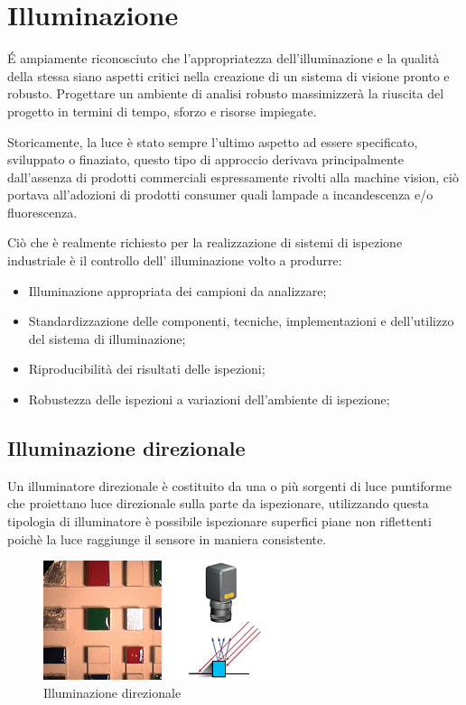 \section{Illuminazione}

 \'{E} ampiamente riconosciuto che l'appropriatezza
dell'illuminazione e la qualità della stessa siano aspetti critici nella
creazione di un sistema di visione pronto e robusto. Progettare un ambiente di
analisi robusto massimizzerà la riuscita del progetto in termini di tempo,
sforzo e risorse impiegate.

Storicamente, la luce è stato sempre l'ultimo aspetto ad essere specificato,
sviluppato o finaziato, questo tipo di approccio derivava principalmente
dall'assenza di prodotti commerciali espressamente rivolti alla machine
vision, ciò portava all'adozioni di prodotti consumer quali lampade a
incandescenza e/o fluorescenza.

Ciò che è realmente richiesto per la realizzazione di sistemi di ispezione
industriale è il controllo dell' illuminazione volto a produrre:

\begin{itemize}
	\item Illuminazione appropriata dei campioni da analizzare;
	\item Standardizzazione delle componenti, tecniche, implementazioni e dell'utilizzo del sistema di illuminazione;
	\item Riproducibilità dei risultati delle ispezioni;
	\item Robustezza delle ispezioni a variazioni dell'ambiente di ispezione;
\end{itemize} 

\subsection{Illuminazione direzionale}

Un illuminatore direzionale è costituito da una o più 
sorgenti di luce puntiforme che proiettano luce direzionale 
sulla parte da ispezionare, utilizzando questa tipologia di 
illuminatore è possibile ispezionare superfici piane non 
riflettenti poichè la luce raggiunge il sensore in maniera consistente. 

\begin{figure}
\centering
\includegraphics[width=.3\textwidth]{img/illuminazione-direzionale.jpg}
\caption{Illuminazione direzionale}\label{fig:illuminazione-direzionale}
\end{figure}

